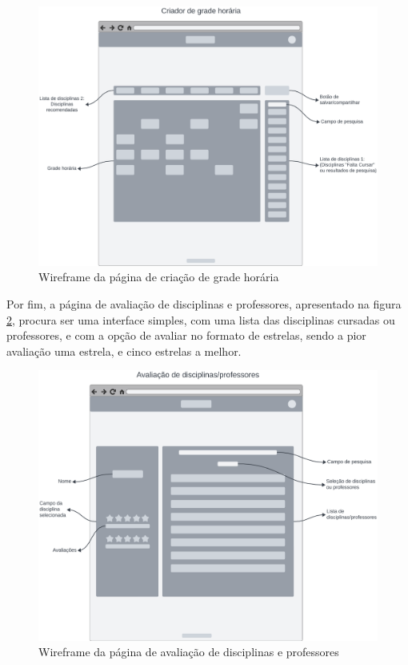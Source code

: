 \begin{figure}[ht]
    \begin{center}
    \includegraphics[width=390pt]{figuras/pagina-criacao.png}
    \caption{Wireframe da página de criação de grade horária}
    \label{fig:wireframe-pagina-criacao}
    \end{center}
\end{figure}

Por fim, a página de avaliação de disciplinas e professores, apresentado na figura \ref{fig:wireframe-pagina-avaliacao}, procura ser uma interface simples, com uma lista das disciplinas cursadas ou professores, e com a opção de avaliar no formato de estrelas, sendo a pior avaliação uma estrela, e cinco estrelas a melhor.

\begin{figure}[ht]
    \begin{center}
    \includegraphics[width=390pt]{figuras/pagina-avaliacao.png}
    \caption{Wireframe da página de avaliação de disciplinas e professores}
    \label{fig:wireframe-pagina-avaliacao}
    \end{center}
\end{figure}